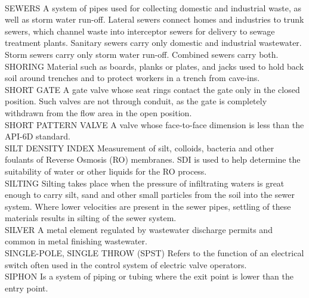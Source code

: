 \documentclass{article}
\begin{document}
\vspace{0.3cm}\\
SEWERS
A system of pipes used for collecting domestic and industrial waste, as well as storm water run-off. Lateral sewers connect homes and industries to trunk sewers, which channel waste into interceptor sewers for delivery to sewage treatment plants. Sanitary sewers carry only domestic and industrial wastewater. Storm sewers carry only storm water run-off. Combined sewers carry both.
\vspace{0.3cm}\\
SHORING
Material such as boards, planks or plates, and jacks used to hold back soil around trenches and to protect workers in a trench from cave-ins. 
\vspace{0.3cm}\\
SHORT GATE
A gate valve whose seat rings contact the gate only in the closed position. Such valves are not through conduit, as the gate is completely withdrawn from the flow area in the open position.
\vspace{0.3cm}\\
SHORT PATTERN VALVE
A valve whose face-to-face dimension is less than the API-6D standard.
\vspace{0.3cm}\\
SILT DENSITY INDEX
Measurement of silt, colloids, bacteria and other foulants of Reverse Osmosis (RO) membranes. SDI is used to help determine the suitability of water or other liquids for the RO process.
\vspace{0.3cm}\\
SILTING
Silting takes place when the pressure of infiltrating waters is great enough to carry silt, sand and other small particles from the soil into the sewer system. Where lower velocities are present in the sewer pipes, settling of these materials results in silting of the sewer system. 
\vspace{0.3cm}\\
SILVER
A metal element regulated by wastewater discharge permits and common in metal finishing wastewater.
\vspace{0.3cm}\\
SINGLE-POLE, SINGLE THROW (SPST)
Refers to the function of an electrical switch often used in the control system of electric valve operators.
\vspace{0.3cm}\\
SIPHON
Is a system of piping or tubing where the exit point is lower than the entry point.
\vspace{0.3cm}\\
\end{document}
